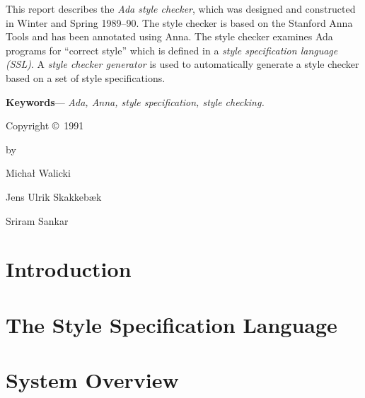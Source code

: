 This report describes the {\em Ada style checker}, which was designed
and constructed in Winter and Spring 1989--90. The style checker is
based on the Stanford Anna Tools and has been annotated using Anna.
The style checker examines Ada programs for ``correct style'' which is
defined in a {\em style specification language (SSL)}.
A {\it style checker generator} is used to automatically generate a
style checker based on a set of style specifications.

\vspace{10pt}

\noindent
{\bf Keywords}---{\it
Ada,
Anna,
style specification,
style checking.}

\newpage

\setcounter{page}{0}

\vspace*{2.8in}

\begin{center}
\Large Copyright \copyright\ 1991
\end{center}

\begin{center}
\large by
\end{center}

\begin{center}
\Large
\strut Micha{\l} Walicki\\
\strut Jens Ulrik Skakkeb{\ae}k\\
\strut Sriram Sankar
\end{center}

\newpage
\setcounter{page}{3}

\newcommand{\version}{1.20}

\tableofcontents

\chapter{Introduction}
\label{intro}


\chapter{The Style Specification Language}
\label{ssl}


\chapter{System Overview}
\label{init-system}


